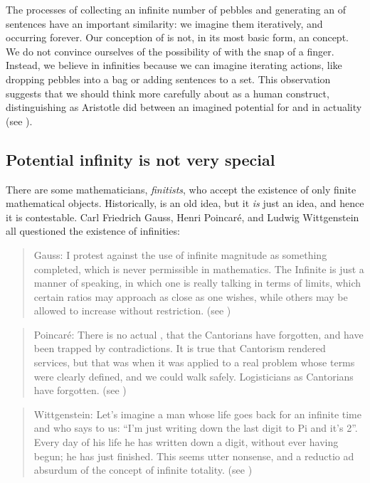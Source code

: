   The processes of collecting an infinite number of pebbles and generating an  of sentences have an important similarity: we imagine them iteratively, and occurring forever. Our conception of  is not, in its most basic form, an  concept. We do not convince ourselves of the possibility of  with the snap of a finger. Instead, we believe in infinities because we can imagine iterating actions, like dropping pebbles into a bag or adding sentences to a set. This observation suggests that we should think more carefully about  as a human construct, distinguishing as Aristotle did between an imagined potential for  and  in actuality (see \citealt{Lear1988}).

\subsection{Potential infinity is not very special}

There are some mathematicians, \textit{finitists}, who accept the existence of only finite mathematical objects. Historically,  is an old idea, but it \textit{is} just an idea, and hence it is contestable. Carl Friedrich Gauss, Henri Poincaré, and Ludwig Wittgenstein all questioned the existence of infinities: 

\begin{quote}
Gauss: I protest against the use of infinite magnitude as something completed, which is never permissible in mathematics. The Infinite is just a manner of speaking, in which one is really talking in terms of limits, which certain ratios may approach as close as one wishes, while others may be allowed to increase without restriction. (see \citealt{Waterhouse1979})
\end{quote}

\begin{quote}
Poincaré: There is no actual , that the Cantorians have forgotten, and have been trapped by contradictions. It is true that Cantorism rendered services, but that was when it was applied to a real problem whose terms were clearly defined, and we could walk safely. Logisticians as Cantorians have forgotten. (see \citealt{PoincaréMaitland2003}) 
\end{quote}

\begin{quote}
Wittgenstein: Let's imagine a man whose life goes back for an infinite time and who says to us: “I'm just writing down the last digit to Pi and it's 2”. Every day of his life he has written down a digit, without ever having begun; he has just finished. This seems utter nonsense, and a reductio ad absurdum of the concept of infinite totality. (see \citealt{Wittgenstein1980})
\end{quote}

